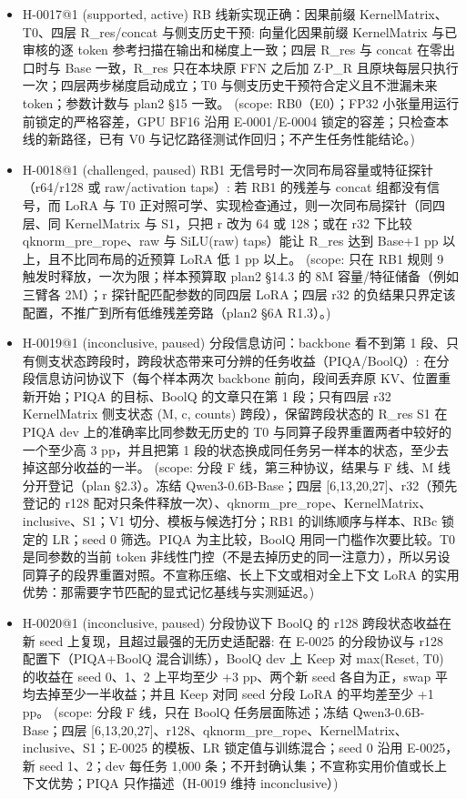 \documentclass[11pt]{article}
\begin{document}
\begin{itemize}
\item H-0017@1 (supported, active) RB 线新实现正确：因果前缀 KernelMatrix、T0、四层 R\_res/concat 与侧支历史干预: 向量化因果前缀 KernelMatrix 与已审核的逐 token 参考扫描在输出和梯度上一致；四层 R\_res 与 concat 在零出口时与 Base 一致，R\_res 只在本块原 FFN 之后加 Z\ensuremath{\cdot}P\_R 且原块每层只执行一次；四层两步梯度启动成立；T0 与侧支历史干预符合定义且不泄漏未来 token；参数计数与 plan2 §15 一致。 (scope: RB0（E0）；FP32 小张量用运行前锁定的严格容差，GPU BF16 沿用 E-0001/E-0004 锁定的容差；只检查本线的新路径，已有 V0 与记忆路径测试作回归；不产生任务性能结论。)
\item H-0018@1 (challenged, paused) RB1 无信号时一次同布局容量或特征探针（r64/r128 或 raw/activation taps）: 若 RB1 的残差与 concat 组都没有信号，而 LoRA 与 T0 正对照可学、实现检查通过，则一次同布局探针（同四层、同 KernelMatrix 与 S1，只把 r 改为 64 或 128；或在 r32 下比较 qknorm\_pre\_rope、raw 与 SiLU(raw) taps）能让 R\_res 达到 Base+1 pp 以上，且不比同布局的近预算 LoRA 低 1 pp 以上。 (scope: 只在 RB1 规则 9 触发时释放，一次为限；样本预算取 plan2 §14.3 的 8M 容量/特征储备（例如三臂各 2M）；r 探针配匹配参数的同四层 LoRA；四层 r32 的负结果只界定该配置，不推广到所有低维残差旁路（plan2 §6A R1.3）。)
\item H-0019@1 (inconclusive, paused) 分段信息访问：backbone 看不到第 1 段、只有侧支状态跨段时，跨段状态带来可分辨的任务收益（PIQA/BoolQ）: 在分段信息访问协议下（每个样本两次 backbone 前向，段间丢弃原 KV、位置重新开始；PIQA 的目标、BoolQ 的文章只在第 1 段；只有四层 r32 KernelMatrix 侧支状态 (M, c, counts) 跨段），保留跨段状态的 R\_res S1 在 PIQA dev 上的准确率比同参数无历史的 T0 与同算子段界重置两者中较好的一个至少高 3 pp，并且把第 1 段的状态换成同任务另一样本的状态，至少去掉这部分收益的一半。 (scope: 分段 F 线，第三种协议，结果与 F 线、M 线分开登记（plan §2.3）。冻结 Qwen3-0.6B-Base；四层 [6,13,20,27]、r32（预先登记的 r128 配对只条件释放一次）、qknorm\_pre\_rope、KernelMatrix、inclusive、S1；V1 切分、模板与候选打分；RB1 的训练顺序与样本、RBc 锁定的 LR；seed 0 筛选。PIQA 为主比较，BoolQ 用同一门槛作次要比较。T0 是同参数的当前 token 非线性门控（不是去掉历史的同一注意力），所以另设同算子的段界重置对照。不宣称压缩、长上下文或相对全上下文 LoRA 的实用优势：那需要字节匹配的显式记忆基线与实测延迟。)
\item H-0020@1 (inconclusive, paused) 分段协议下 BoolQ 的 r128 跨段状态收益在新 seed 上复现，且超过最强的无历史适配器: 在 E-0025 的分段协议与 r128 配置下（PIQA+BoolQ 混合训练），BoolQ dev 上 Keep 对 max(Reset, T0) 的收益在 seed 0、1、2 上平均至少 +3 pp、两个新 seed 各自为正，swap 平均去掉至少一半收益；并且 Keep 对同 seed 分段 LoRA 的平均差至少 +1 pp。 (scope: 分段 F 线，只在 BoolQ 任务层面陈述；冻结 Qwen3-0.6B-Base；四层 [6,13,20,27]、r128、qknorm\_pre\_rope、KernelMatrix、inclusive、S1；E-0025 的模板、LR 锁定值与训练混合；seed 0 沿用 E-0025，新 seed 1、2；dev 每任务 1,000 条；不开封确认集；不宣称实用价值或长上下文优势；PIQA 只作描述（H-0019 维持 inconclusive）)

\end{itemize}
\end{document}
